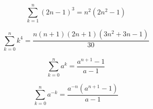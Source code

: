 \documentclass[./\jobname.tex]{subfiles}
\begin{document}
\begin{equation*}
	\sum_{k = 1}^{n} (2n - 1)^3 = n^2(2n^2 - 1)
\end{equation*}

\noindent\makebox[\linewidth]{\rule{\paperwidth}{0.4pt}}

\begin{equation*}
	\sum_{k = 0}^{n} k^4 = \frac{n(n + 1)(2n + 1)(3n^2 + 3n - 1)}{30}
\end{equation*}

\noindent\makebox[\linewidth]{\rule{\paperwidth}{0.4pt}}

\begin{equation*}
	\sum_{k = 0}^{n} a^k = \frac{a^{n+1} - 1}{a -1}
\end{equation*}

\noindent\makebox[\linewidth]{\rule{\paperwidth}{0.4pt}}

\begin{equation*}
	\sum_{k = 0}^{n} a^{-k} = \frac{a^{-n}(a^{n+1} - 1)}{a - 1}
\end{equation*}

\noindent\makebox[\linewidth]{\rule{\paperwidth}{0.4pt}}
\end{document}
